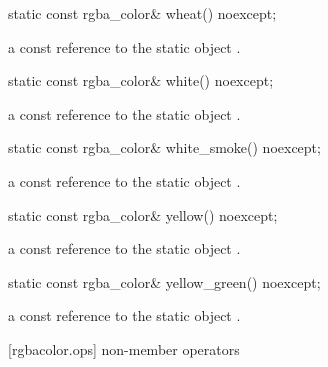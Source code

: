 \begin{itemdecl}
static const rgba_color& wheat() noexcept;
\end{itemdecl}
\begin{itemdescr}
\pnum
\returns
a const reference to the static  object .
\end{itemdescr}

\begin{itemdecl}
static const rgba_color& white() noexcept;
\end{itemdecl}
\begin{itemdescr}
\pnum
\returns
a const reference to the static  object .
\end{itemdescr}

\begin{itemdecl}
static const rgba_color& white_smoke() noexcept;
\end{itemdecl}
\begin{itemdescr}
\pnum
\returns
a const reference to the static  object .
\end{itemdescr}

\begin{itemdecl}
static const rgba_color& yellow() noexcept;
\end{itemdecl}
\begin{itemdescr}
\pnum
\returns
a const reference to the static  object .
\end{itemdescr}

\begin{itemdecl}
static const rgba_color& yellow_green() noexcept;
\end{itemdecl}
\begin{itemdescr}
\pnum
\returns
a const reference to the static  object .
\end{itemdescr}

 [rgbacolor.ops] { non-member operators}

